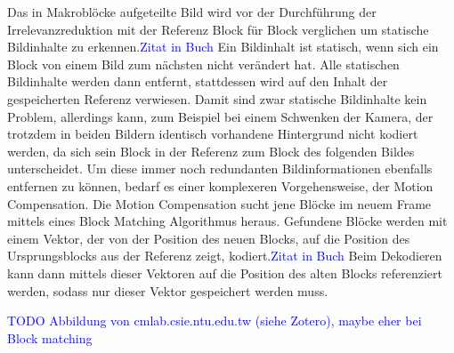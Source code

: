 Das in Makroblöcke aufgeteilte Bild wird vor der Durchführung der Irrelevanzreduktion mit der Referenz Block für Block verglichen um statische Bildinhalte zu erkennen.\textcolor{blue}{Zitat in Buch} Ein Bildinhalt ist statisch, wenn sich ein Block von einem Bild zum nächsten nicht verändert hat. Alle statischen Bildinhalte werden dann entfernt, stattdessen wird auf den Inhalt der gespeicherten Referenz verwiesen. 
Damit sind zwar statische Bildinhalte kein Problem, allerdings kann, zum Beispiel bei einem Schwenken der Kamera, der trotzdem in beiden Bildern identisch vorhandene Hintergrund nicht kodiert werden, da sich sein Block in der Referenz zum Block des folgenden Bildes unterscheidet. Um diese immer noch redundanten Bildinformationen ebenfalls entfernen zu können, bedarf es einer komplexeren Vorgehensweise, der Motion Compensation.
Die Motion Compensation sucht jene Blöcke im neuem Frame mittels eines Block Matching Algorithmus heraus. Gefundene Blöcke werden mit einem Vektor, der von der Position des neuen Blocks, auf die Position des Ursprungsblocks aus der Referenz zeigt, kodiert.\textcolor{blue}{Zitat in Buch} Beim Dekodieren kann dann mittels dieser Vektoren auf die Position des alten Blocks referenziert werden, sodass nur dieser Vektor gespeichert werden muss.

\textcolor{blue}{TODO Abbildung von cmlab.csie.ntu.edu.tw (siehe Zotero), maybe eher bei Block matching}



